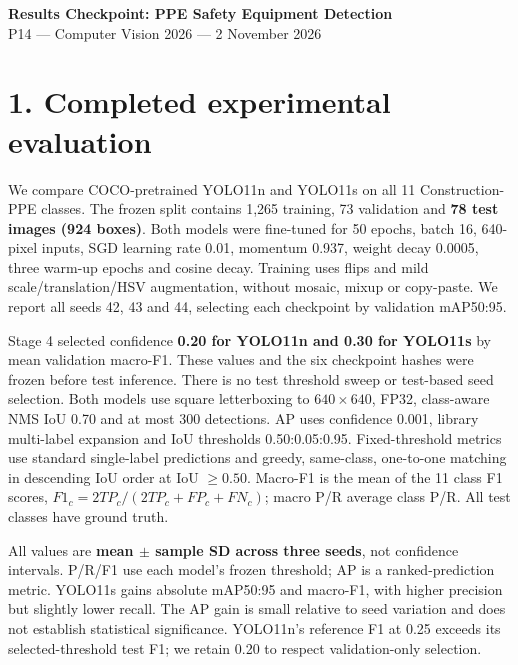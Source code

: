 \documentclass[10pt,a4paper]{article}
\begin{document}
\begin{center}
{\Large\bfseries Results Checkpoint: PPE Safety Equipment Detection}\\[3pt]
P14 --- Computer Vision 2026 --- 2 November 2026
\end{center}
\section*{1. Completed experimental evaluation}
We compare COCO-pretrained YOLO11n and YOLO11s on all 11 Construction-PPE classes. The frozen split contains 1,265 training, 73 validation and \textbf{78 test images (924 boxes)}. Both models were fine-tuned for 50 epochs, batch 16, 640-pixel inputs, SGD learning rate 0.01, momentum 0.937, weight decay 0.0005, three warm-up epochs and cosine decay. Training uses flips and mild scale/translation/HSV augmentation, without mosaic, mixup or copy-paste. We report all seeds 42, 43 and 44, selecting each checkpoint by validation mAP50:95.

Stage 4 selected confidence \textbf{0.20 for YOLO11n and 0.30 for YOLO11s} by mean validation macro-F1. These values and the six checkpoint hashes were frozen before test inference. There is no test threshold sweep or test-based seed selection. Both models use square letterboxing to $640\times640$, FP32, class-aware NMS IoU 0.70 and at most 300 detections. AP uses confidence 0.001, library multi-label expansion and IoU thresholds 0.50:0.05:0.95. Fixed-threshold metrics use standard single-label predictions and greedy, same-class, one-to-one matching in descending IoU order at IoU $\geq0.50$. Macro-F1 is the mean of the 11 class F1 scores, $F1_c=2TP_c/(2TP_c+FP_c+FN_c)$; macro P/R average class P/R. All test classes have ground truth.
\begin{center}\small\end{center}
All values are \textbf{mean $\pm$ sample SD across three seeds}, not confidence intervals. P/R/F1 use each model's frozen threshold; AP is a ranked-prediction metric. YOLO11s gains \APgain{} absolute mAP50:95 and \Fgain{} macro-F1, with higher precision but slightly lower recall. The AP gain is small relative to seed variation and does not establish statistical significance. YOLO11n's reference F1 at 0.25 exceeds its selected-threshold test F1; we retain 0.20 to respect validation-only selection.
\begin{center}\small\end{center}
\end{document}
